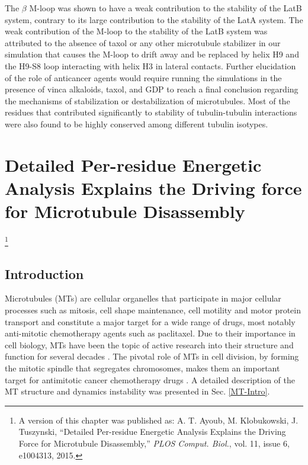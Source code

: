 \documentclass[11pt]{report}
\begin{document}
The $\beta$ M-loop was shown to have a weak contribution to
the stability of the LatB system, contrary to its large contribution to the stability of the LatA system. The weak contribution of the M-loop to the stability of the LatB system was attributed to the absence of taxol or any other microtubule stabilizer in our simulation that causes the M-loop to drift away and be replaced by helix H9 and the H9-S8 loop interacting with helix H3 in lateral contacts. Further elucidation of the role of anticancer agents would require running the
simulations in the presence of vinca alkaloids, taxol, and GDP to reach a final conclusion regarding the mechanisms of stabilization or destabilization of microtubules. Most of the residues that contributed significantly to stability of tubulin-tubulin interactions were also found to be highly conserved among different tubulin isotypes.


\chapter{Detailed Per-residue Energetic Analysis Explains the
Driving force for Microtubule Disassembly}
\label{ligHB}

\footnote{A version of this chapter was 
published as: A. T. Ayoub, M. Klobukowski, J. Tuszynski,
``Detailed Per-residue Energetic Analysis Explains the Driving Force for Microtubule Disassembly,'' \emph{PLOS Comput. Biol.}, vol. 11, issue 6, e1004313, 2015.}

\section{Introduction}

Microtubules (MTs) are cellular organelles that participate in major cellular processes such as mitosis, cell shape maintenance, cell motility and motor protein transport and constitute a major target for a wide range of drugs, most notably anti-mitotic chemotherapy agents such as paclitaxel.
Due to their importance in cell biology, MTs
have been the topic of active research into their structure and function for several decades \cite{Hyams1993}.
The pivotal role of MTs in 
cell division, by forming the mitotic spindle that segregates chromosomes, makes them an important target for antimitotic cancer chemotherapy drugs \cite{Hayden1990,Dumontet2010}. A detailed description of the MT structure
and dynamics instability was presented in Sec. \ref{MT-Intro}.
\end{document}

